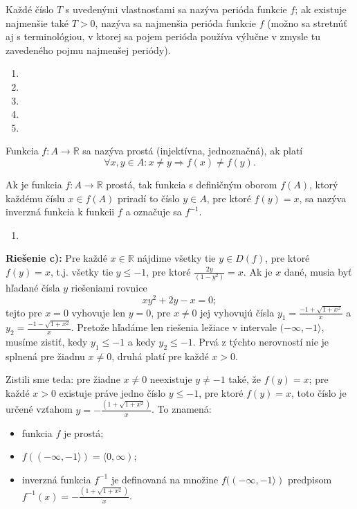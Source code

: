 Každé číslo $T$ s uvedenými vlastnosťami sa nazýva perióda funkcie $f$; ak existuje najmenšie také $T>0$, nazýva sa najmenšia perióda funkcie $f$ (možno sa stretnúť aj s terminológiou, v ktorej sa pojem perióda používa výlučne v zmysle tu zavedeného pojmu najmenšej periódy).

\begin{enumerate}[resume]
  \item {}
  \item {}
  \item {}
  \item {}
  \item {}
\end{enumerate}

Funkcia $f:A \rightarrow\mathbb{R}$ sa nazýva prostá (injektívna, jednoznačná), ak platí $$\forall x,y\in A:x\neq y\Rightarrow f(x)\neq f(y).$$

Ak je funkcia $f:A \rightarrow\mathbb{R}$ prostá, tak funkcia s definičným oborom $f(A)$, ktorý každému číslu $x\in f(A)$ priradí to číslo $y\in A$, pre ktoré $f(y)=x$, sa nazýva inverzná funkcia k funkcii $f$ a označuje sa $f^{-1}$.

\begin{enumerate}[resume]
  \item {}
\end{enumerate}

\textbf{Riešenie c):} Pre každé $x\in\mathbb{R}$ nájdime všetky tie $y\in D(f)$, pre ktoré $f(y)=x$, t.j. všetky tie $y\leq -1$, pre ktoré $\frac{2y}{(1-y^2)}=x$. Ak je $x$ dané, musia byť hľadané čísla $y$ riešeniami rovnice $$xy^2+2y-x=0;$$ tejto pre $x=0$ vyhovuje len $y=0$, pre $x\neq 0$ jej vyhovujú čísla $y_1=\frac{-1+\sqrt{1+x^2}}{x}$ a $y_2=\frac{-1-\sqrt{1+x^2}}{x}$. Pretože hľadáme len riešenia ležiace v intervale $(-\infty,-1\rangle$, musíme zistiť, kedy $y_1\leq -1$ a kedy $y_2\leq -1$. Prvá z týchto nerovností nie je splnená pre žiadnu $x\neq 0$, druhá platí pre každé $x>0$.

Zistili sme teda: pre žiadne $x\neq 0$ neexistuje $y\neq -1$ také, že $f(y)=x$; pre každé $x>0$ existuje práve jedno číslo $y\leq -1$, pre ktoré $f(y)=x$, toto číslo je určené vzťahom $y=-\frac{(1+\sqrt{1+x^2})}{x}$. To znamená:
\begin{itemize}
\item funkcia $f$ je prostá;
\item $f((-\infty,-1\rangle)=\langle 0,\infty )$;
\item inverzná funkcia $f^{-1}$ je definovaná na množine $f((-\infty,-1\rangle)$ predpisom $f^{-1}(x)=-\frac{(1+\sqrt{1+x^2})}{x}$.
\end{itemize}

